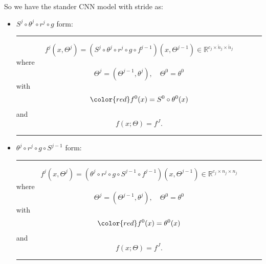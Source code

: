 So we have the stander CNN model with stride as:
\begin{itemize}
	\item {\color{red} $S^j \circ \theta^j\circ r^j\circ g$ form:}
	\bigskip \hrule \bigskip  
	\begin{equation}\label{CNN_stride_iteration_vector}
	f^j(x,\Theta^j) = (S^j \circ \theta^j\circ r^j\circ g\circ f^{j-1})(x,\Theta^{j-1}) \in \mathbb{R}^{c_j \times \tilde n_j \times \tilde n_j }
	\end{equation}
	where
	\begin{equation}
	\Theta^j=(\Theta^{j-1},\theta^j), \quad \Theta^0=\theta^0 
	\end{equation}
	with 
	\begin{equation}
	{\color{red} f^0(x)=S^0 \circ \theta^0(x)}
	\end{equation}
	and 
	\begin{equation}\label{CNN_finallayer}
	f(x; \Theta) = f^J.
	\end{equation}
	\bigskip \hrule \bigskip  
	
	\item {\color{red} $\theta^j\circ r^j\circ g \circ S^{j-1} $ form:}
	\bigskip \hrule \bigskip  
	\begin{equation}\label{CNN_stride_iteration_vector}
	f^j(x,\Theta^j) = (\theta^j\circ r^j\circ g \circ S^{j-1} \circ f^{j-1})(x,\Theta^{j-1}) \in \mathbb{R}^{c_j \times n_j \times n_j }
	\end{equation}
	where
	\begin{equation}
	\Theta^j=(\Theta^{j-1},\theta^j), \quad \Theta^0=\theta^0 
	\end{equation}
	with 
	\begin{equation}
	{\color{red} f^0(x)=\theta^0(x)}
	\end{equation}
	and 
	\begin{equation}\label{CNN_finallayer}
	f(x; \Theta) = f^J.
	\end{equation}
	\bigskip \hrule \bigskip  
\end{itemize}

